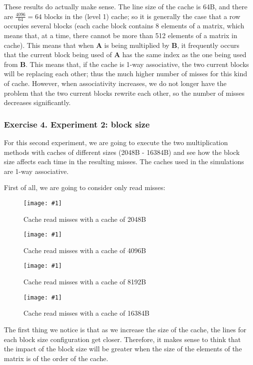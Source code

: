 \documentclass{article}
\newcommand{\myFigure}[4]{%
    \begin{figure}[!ht]
        \texttt{[image: \#1]}
        \centering
        \caption{#2}
        \label{#3}
    \end{figure}
}
\begin{document}
These results do actually make sense. The line size of the cache is 64B, and there are $\frac{4096}{64}=64$ blocks in the 
(level 1) cache; so it is generally the case that a row occupies several blocks (each cache block contains 8 elements of a matrix, which means that, at a time, there cannot be more than 512 elements of a matrix in cache). This means that when $\mathbf{A}$ is being multiplied by $\mathbf{B}$, it frequently occurs that the current block being used of $\mathbf{A}$ has the same index as the one being used from $\mathbf{B}$. This means that, if the cache is 1-way associative, the two current blocks will be replacing each other; thus the much higher number of misses for this kind of cache. However, when associativity increases, we do not longer have the problem that the two current blocks rewrite each other, so the number of misses decreases significantly.


\subsubsection*{Exercise 4. Experiment 2: block size}

For this second experiment, we are going to execute the two multiplication methods with caches of different sizes (2048B - 16384B) and see how the block size affects each time in the resulting misses. The caches used in the simulations are 1-way associative.

First of all, we are going to consider only read misses:

\myFigure{../material_P3/protect_out4/BlockSize_2048/cache_lectura.png}{Cache read misses with a cache of 2048B}{block_2048_lec}{0.55}


\myFigure{../material_P3/protect_out4/BlockSize_4096/cache_lectura.png}{Cache read misses with a cache of 4096B}{block_4096_lec}{0.55}

\myFigure{../material_P3/protect_out4/BlockSize_8192/cache_lectura.png}{Cache read misses with a cache of 8192B}{block_8192B_lec}{0.55}

\myFigure{../material_P3/protect_out4/BlockSize_16384/cache_lectura.png}{Cache read misses with a cache of 16384B}{block_16384B_lec}{0.55}

The first thing we notice is that as we increase the size of the cache, the lines for each block size configuration get closer. Therefore, it makes sense to think that the impact of the block size will be greater when the size of the elements of the matrix is of the order of the cache.
\end{document}
